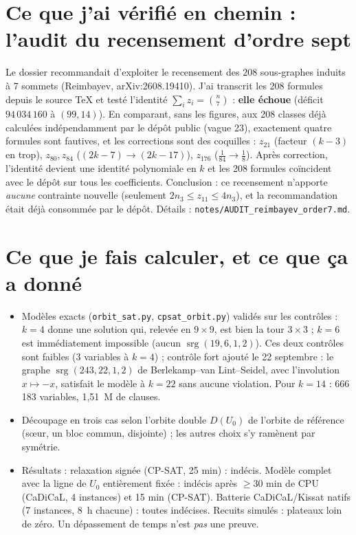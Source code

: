 \documentclass[11pt,a4paper]{article}
\theoremstyle{definition}
\theoremstyle{remark}
\newcommand{\srg}{\operatorname{srg}}
\begin{document}
\section{Ce que j'ai vérifié en chemin : l'audit du recensement d'ordre sept}
Le dossier recommandait d'exploiter le recensement des 208 sous-graphes induits à 7 sommets (Reimbayev, arXiv:2608.19410). J'ai transcrit les 208 formules
depuis le source \TeX{} et testé l'identité $\sum_i z_i=\binom{n}{7}$ : \textbf{elle échoue} (déficit $94\,034\,160$ à $(99,14)$). En comparant, sans les figures,
aux 208 classes déjà calculées indépendamment par le dépôt public (vague 23), exactement quatre formules sont fautives, et les corrections sont des coquilles :
$z_{21}$ (facteur $(k-3)$ en trop), $z_{80},z_{84}$ ($(2k-7)\to(2k-17)$), $z_{176}$ ($\tfrac1{84}\to\tfrac18$). Après correction, l'identité devient une identité
polynomiale en $k$ et les 208 formules coïncident avec le dépôt sur tous les coefficients. Conclusion : ce recensement n'apporte \emph{aucune} contrainte nouvelle
(seulement $2n_3\le z_{11}\le4n_3$), et la recommandation était déjà consommée par le dépôt. Détails : \texttt{notes/AUDIT\_reimbayev\_order7.md}.

\section{Ce que je fais calculer, et ce que ça a donné}
\begin{itemize}[nosep]
\item Modèles exacts (\texttt{orbit\_sat.py}, \texttt{cpsat\_orbit.py}) validés sur les contrôles : $k=4$ donne une solution qui, relevée en $9\times9$, est bien
la tour $3\times3$ ; $k=6$ est immédiatement impossible (aucun $\srg(19,6,1,2)$). Ces deux contrôles sont faibles (3 variables à $k=4$) ; contrôle fort ajouté le 22 septembre :
le graphe $\srg(243,22,1,2)$ de Berlekamp--van Lint--Seidel, avec l'involution $x\mapsto-x$, satisfait le modèle à $k=22$ sans aucune violation. Pour $k=14$ : 666\,183 variables, 1,51~M de clauses.
\item Découpage en trois cas selon l'orbite double $D(U_0)$ de l'orbite de référence (sœur, un bloc commun, disjointe) ; les autres choix s'y ramènent par symétrie.
\item Résultats : relaxation signée (CP-SAT, 25 min) : indécis. Modèle complet avec la ligne de $U_0$ entièrement fixée : indécis après $\ge30$ min de CPU
(CaDiCaL, 4 instances) et 15 min (CP-SAT). Batterie CaDiCaL/Kissat natifs (7 instances, 8~h chacune) : toutes indécises. Recuits simulés : plateaux loin de zéro.
Un dépassement de temps n'est \emph{pas} une preuve.
\end{itemize}
\end{document}
